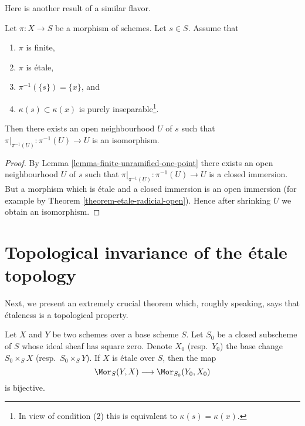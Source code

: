 \noindent
Here is another result of a similar flavor.

\begin{lemma}
\label{lemma-finite-etale-one-point}
Let $\pi : X \to S$ be a morphism of schemes. Let $s \in S$.
Assume that
\begin{enumerate}
\item $\pi$ is finite,
\item $\pi$ is \'etale,
\item $\pi^{-1}(\{s\}) = \{x\}$, and
\item $\kappa(s) \subset \kappa(x)$ is purely
inseparable\footnote{In view of condition (2)
this is equivalent to $\kappa(s) = \kappa(x)$.}.
\end{enumerate}
Then there exists an open neighbourhood $U$ of $s$ such that
$\pi|_{\pi^{-1}(U)} : \pi^{-1}(U) \to U$ is an isomorphism.
\end{lemma}

\begin{proof}
By
Lemma \ref{lemma-finite-unramified-one-point}
there exists an open neighbourhood $U$ of $s$ such that
$\pi|_{\pi^{-1}(U)} : \pi^{-1}(U) \to U$ is a closed immersion.
But a morphism which is \'etale and a closed immersion is an
open immersion (for example by
Theorem \ref{theorem-etale-radicial-open}).
Hence after shrinking $U$ we obtain an isomorphism.
\end{proof}




\section{Topological invariance of the \'etale topology}
\label{section-topological-invariance}

\noindent
Next, we present an extremely crucial theorem which, roughly speaking, says
that \'etaleness is a topological property.

\begin{theorem}
\label{theorem-etale-topological}
Let $X$ and $Y$ be two schemes over a base scheme $S$.
Let $S_0$ be a closed subscheme of $S$ whose ideal sheaf has square zero.
Denote $X_0$ (resp.\ $Y_0$) the base change $S_0 \times_S X$
(resp.\ $S_0 \times_S Y$).
If $X$ is \'etale over $S$, then the map
$$
\Mor_S(Y, X) \longrightarrow \Mor_{S_0}(Y_0, X_0)
$$
is bijective.
\end{theorem}

